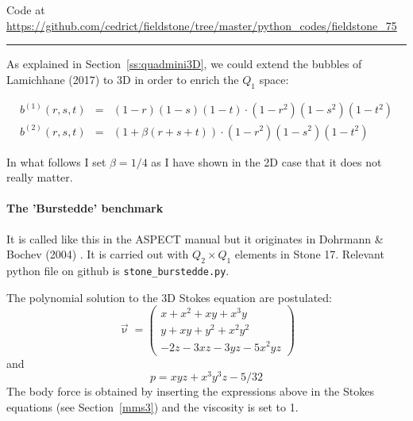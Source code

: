

\begin{center}
Code at \url{https://github.com/cedrict/fieldstone/tree/master/python_codes/fieldstone_75}
\end{center}

\par\noindent\rule{\textwidth}{0.4pt}


As explained in Section~\ref{ss:quadmini3D}, we could extend the bubbles 
of Lamichhane (2017) \cite{lami17} to 3D in order to enrich the $Q_1$ space:

\begin{eqnarray}
b^{(1)} (r,s,t) &=& (1-r)(1-s)(1-t) \cdot (1-r^2) (1-s^2) (1-t^2) \\
b^{(2)} (r,s,t) &=& (1 + \beta(r+s+t)) \cdot (1-r^2) (1-s^2) (1-t^2) 
\end{eqnarray}

In what follows I set $\beta=1/4$ as I have shown in the 2D case that it does not really matter. 

\paragraph{The 'Burstedde' benchmark} It is called like this in the ASPECT manual 
but it originates in Dohrmann \& Bochev (2004) \cite{dobo04}. It is carried 
out with $Q_2 \times Q_1$ elements in Stone 17. 
Relevant python file on github is {\tt stone\_burstedde.py}.

The polynomial solution to the 3D Stokes equation are postulated:
\begin{equation}
\vec{\upnu}
=
\left(
\begin{array}{c}
x+x^2+xy+x^3y \\
y + xy + y^2 + x^2 y^2\\
-2z - 3xz - 3yz - 5x^2 yz
\end{array}
\right)
\end{equation}
and
\begin{equation}
p = xyz + x^3 y^3z - 5/32
\end{equation}
The body force is obtained by inserting the expressions above in the Stokes equations
(see Section~\ref{mms3}) and the viscosity is set to 1.


